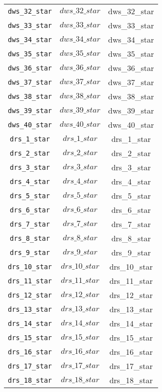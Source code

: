\begin{center}
\begin{longtable}{ccc}
\texttt{dws\_32\_star} & $dws\_32\_star$ & dws\_32\_star\\
\texttt{dws\_33\_star} & $dws\_33\_star$ & dws\_33\_star\\
\texttt{dws\_34\_star} & $dws\_34\_star$ & dws\_34\_star\\
\texttt{dws\_35\_star} & $dws\_35\_star$ & dws\_35\_star\\
\texttt{dws\_36\_star} & $dws\_36\_star$ & dws\_36\_star\\
\texttt{dws\_37\_star} & $dws\_37\_star$ & dws\_37\_star\\
\texttt{dws\_38\_star} & $dws\_38\_star$ & dws\_38\_star\\
\texttt{dws\_39\_star} & $dws\_39\_star$ & dws\_39\_star\\
\texttt{dws\_40\_star} & $dws\_40\_star$ & dws\_40\_star\\
\texttt{drs\_1\_star} & $drs\_1\_star$ & drs\_1\_star\\
\texttt{drs\_2\_star} & $drs\_2\_star$ & drs\_2\_star\\
\texttt{drs\_3\_star} & $drs\_3\_star$ & drs\_3\_star\\
\texttt{drs\_4\_star} & $drs\_4\_star$ & drs\_4\_star\\
\texttt{drs\_5\_star} & $drs\_5\_star$ & drs\_5\_star\\
\texttt{drs\_6\_star} & $drs\_6\_star$ & drs\_6\_star\\
\texttt{drs\_7\_star} & $drs\_7\_star$ & drs\_7\_star\\
\texttt{drs\_8\_star} & $drs\_8\_star$ & drs\_8\_star\\
\texttt{drs\_9\_star} & $drs\_9\_star$ & drs\_9\_star\\
\texttt{drs\_10\_star} & $drs\_10\_star$ & drs\_10\_star\\
\texttt{drs\_11\_star} & $drs\_11\_star$ & drs\_11\_star\\
\texttt{drs\_12\_star} & $drs\_12\_star$ & drs\_12\_star\\
\texttt{drs\_13\_star} & $drs\_13\_star$ & drs\_13\_star\\
\texttt{drs\_14\_star} & $drs\_14\_star$ & drs\_14\_star\\
\texttt{drs\_15\_star} & $drs\_15\_star$ & drs\_15\_star\\
\texttt{drs\_16\_star} & $drs\_16\_star$ & drs\_16\_star\\
\texttt{drs\_17\_star} & $drs\_17\_star$ & drs\_17\_star\\
\texttt{drs\_18\_star} & $drs\_18\_star$ & drs\_18\_star\\

\end{longtable}
\end{center}
